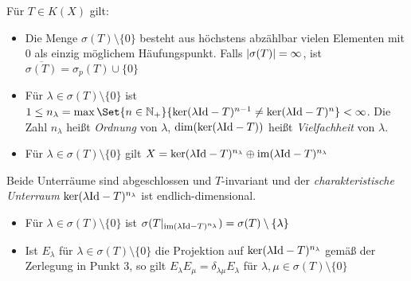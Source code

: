 \documentclass{cheat-sheet}
\begin{document}
\begin{satz}
  Für $T \in K(X)$ gilt:
  \begin{itemize}
    \item Die Menge $\sigma(T) \setminus \{ 0 \}$ besteht aus höchstens abzählbar vielen Elementen mit $0$ als einzig möglichem Häufungspunkt. Falls $\lvert\sigma(T)\rvert = \infty$, ist $\overline{\sigma(T)} = \sigma_p(T) \cup \{ 0 \}$
    \item Für $\lambda \in \sigma(T) \setminus \{ 0 \}$ ist $1 \leq n_{\lambda} = \max \Set{n \in \N_{+}}{ \ker(\lambda \Id - T)^{n-1} \not= \ker(\lambda \Id - T)^n } < \infty$. Die Zahl $n_\lambda$ heißt \emph{Ordnung} von $\lambda$, $\dim (\ker (\lambda \mathrm{Id} - T))$ heißt \emph{Vielfachheit} von $\lambda$.
    \item Für $\lambda \in \sigma(T) \setminus \{ 0 \}$ gilt $X = \ker (\lambda \mathrm{Id} - T)^{n_\lambda} \oplus \mathop{\mathrm{im}} (\lambda \mathrm{Id} - T)^{n_\lambda}$
  \end{itemize}
  Beide Unterräume sind abgeschlossen und $T$-invariant und der \emph{charakteristische Unterraum} $\ker (\lambda \mathrm{Id} - T)^{n_\lambda}$ ist endlich-dimensional.
  \begin{itemize}
    \item  Für $\lambda \in \sigma(T) \setminus \{ 0 \}$ ist $\sigma(T|_{\mathop{\mathrm{im}} (\lambda \mathrm{Id} - T)^{n_\lambda}}) = \sigma(T) \setminus \{ \lambda \}$
    \item Ist $E_\lambda$ für $\lambda \in \sigma(T) \setminus \{ 0 \}$ die Projektion auf $\ker (\lambda \mathrm{Id} - T)^{n_\lambda}$ gemäß der Zerlegung in Punkt 3, so gilt $E_\lambda E_\mu = \delta_{\lambda \mu} E_\lambda$ für $\lambda, \mu \in \sigma(T) \setminus \{ 0 \}$
  \end{itemize}
\end{satz}
\end{document}
